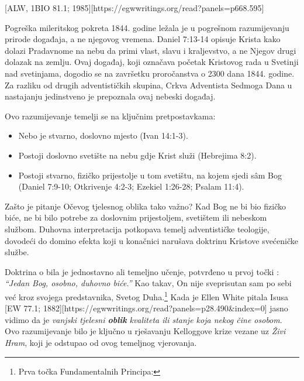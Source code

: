 [ALW, 1BIO 81.1; 1985][https://egwwritings.org/read?panels=p668.595]

Pogreška mileritskog pokreta 1844. godine ležala je u pogrešnom razumijevanju prirode događaja, a ne njegovog vremena. Daniel 7:13-14 opisuje Krista kako dolazi Pradavnome na nebu da primi vlast, slavu i kraljevstvo, a ne Njegov drugi dolazak na zemlju. Ovaj događaj, koji označava početak Kristovog rada u Svetinji nad svetinjama, dogodio se na završetku proročanstva o 2300 dana 1844. godine. Za razliku od drugih adventističkih skupina, Crkva Adventista Sedmoga Dana u nastajanju jedinstveno je prepoznala ovaj nebeski događaj.

Ovo razumijevanje temelji se na ključnim pretpostavkama:
\begin{itemize}
    \item Nebo je stvarno, doslovno mjesto (Ivan 14:1-3).
    \item Postoji doslovno svetište na nebu gdje Krist služi (Hebrejima 8:2).
    \item Postoji stvarno, fizičko prijestolje u tom svetištu, na kojem sjedi sâm Bog (Daniel 7:9-10; Otkrivenje 4:2-3; Ezekiel 1:26-28; Psalam 11:4).
\end{itemize}

Zašto je pitanje Očevog tjelesnog oblika tako važno? Kad Bog ne bi bio fizičko biće, ne bi bilo potrebe za doslovnim prijestoljem, svetištem ili nebeskom službom. Duhovna interpretacija potkopava temelj adventističke teologije, dovodeći do domino efekta koji u konačnici narušava doktrinu Kristove svećeničke službe.

Doktrina o  bila je jednostavno ali temeljno učenje, potvrđeno u prvoj točki : \textit{“Jedan Bog, osobno, duhovno biće.”} Kao takav, On nije sveprisutan sam po sebi već kroz svojega predstavnika, Svetog Duha.\footnote{Prva točka Fundamentalnih Principa: } Kada je Ellen White pitala Isusa [EW 77.1; 1882][https://egwwritings.org/read?panels=p28.490&index=0] jasno vidimo da je \textit{vanjski tjelesni \textbf{oblik}} \textit{kvaliteta ili stanje koja nekog čine osobom}. Ovo razumijevanje bilo je ključno u rješavanju Kelloggove krize vezane uz \textit{Živi Hram}, koji je odstupao od ovog temeljnog vjerovanja.

